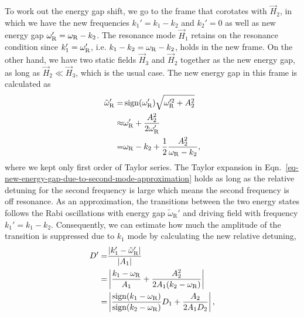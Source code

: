 To work out the energy gap shift, we go to the frame that corotates with $\vec H_2$, in which we have the new frequencies $k_1'=k_1-k_2$ and $k_2'=0$ as well as new energy gap $\omega_{\mathrm R}' = \omega_{\mathrm R}- k_2$. The resonance mode $\vec H_1$ retains on the resonance condition since $k_1'=\omega_{\mathrm R}'$, i.e. $k_1-k_2 = \omega_{\mathrm R}-k_2$, holds in the new frame. On the other hand, we have two static fields $\vec H_3$ and $\vec H_2$ together as the new energy gap, as long as $\vec H_2\ll \vec H_3$, which is the usual case. The new energy gap in this frame is calculated as
\begin{align}
    \tilde\omega_{\mathrm{R}}' =& \sign (\omega_{\mathrm R}') \sqrt{\omega_{\mathrm{R}}'^2 + A_2^2 } \nonumber\\
    \approx & \omega_{\mathrm{R}}' + \frac{A_2^2}{2\omega_{\mathrm R}'} \nonumber\\
    =& \omega_{\mathrm R} - k_2 + \frac{1}{2}\frac{A_2^2}{\omega_{\mathrm R} - k_2},
    \label{eq-new-energy-gap-due-to-second-mode-approximation}
\end{align}
where we kept only first order of Taylor series. The Taylor expansion in Eqn.~\ref{eq-new-energy-gap-due-to-second-mode-approximation} holds as long as the relative detuning for the second frequency is large which means the second frequency is off resonance. As an approximation, the transitions between the two energy states follows the Rabi oscillations with energy gap $\tilde \omega_{\mathrm R}'$ and driving field with frequency $k_1'=k_1-k_2$. Consequently, we can estimate how much the amplitude of the transition is suppressed due to $k_1$ mode by calculating the new relative detuning,
\begin{align}
    \RD' =& \frac{\lvert k_1' - \tilde \omega_{\mathrm R}' \rvert}{\lvert A_1 \rvert}\nonumber\\
    =& \left \lvert \frac{ k_1-\omega_{\mathrm R}}{ A_1} + \frac{ A_2^2 }{2  A_1 ( k_2 - \omega_{\mathrm R})} \right  \rvert\\
    =& \left \lvert  \frac{\sign({ k_1-\omega_{\mathrm R}})}{\sign (k_2 - \omega_{\mathrm R})} \RD_1 +  \frac{ A_2 }{2 A_1 \RD_2 }\right \rvert ,
    \label{app:chap:matter-eq:relative-detuning-changed}
\end{align}
